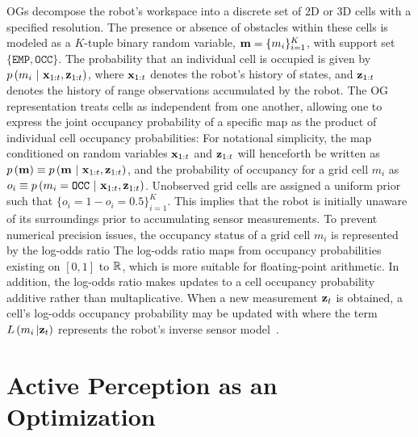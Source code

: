 OGs decompose the robot's workspace into a discrete set of 2D or 3D cells with a
specified resolution. The presence or absence of obstacles within these cells is modeled
as a $K$-tuple binary random variable, $\mathbf{m} = \{m_{i}\}_{i=1}^{K}$, with support set
$\{\texttt{EMP}, \texttt{OCC}\}$. The probability that an individual cell is occupied is
given by $p\left(m_{i} \ \vert \ \mathbf{x}_{1:t}, \mathbf{z}_{1:t}\right)$, where $\mathbf{x}_{1:t}$ denotes the
robot's history of states, and $\mathbf{z}_{1:t}$ denotes the history of range observations
accumulated by the robot. The OG representation treats cells as independent from one another,
allowing one to express the joint occupancy probability of a specific map as the product of individual
cell occupancy probabilities:
%
%
For notational simplicity, the map conditioned on random variables
$\mathbf{x}_{1:t}$ and $\mathbf{z}_{1:t}$ will henceforth be written as $p\left(\mathbf{m}\right)
\equiv p\left(\mathbf{m} \ \vert \ \mathbf{x}_{1:t}, \mathbf{z}_{1:t}\right)$, and the probability of occupancy
for a grid cell $m_i$ as $o_{i}\equiv p\left(m_{i}=\texttt{OCC}\ \vert \
\mbf{x}_{1:t}, \mbf{z}_{1:t}\right)$.
Unobserved grid cells are assigned a uniform prior such that
$\{o_{i} = 1 - o_{i} = 0.5\}_{i=1}^{K}$. This implies that the robot is
initially unaware of its surroundings prior to accumulating sensor measurements.
To prevent numerical precision issues, the
occupancy status of a grid cell $m_i$ is represented by the log-odds ratio
%
%
The log-odds ratio maps from occupancy probabilities existing on $[0, 1]$ to
${\mathbb{R}}$, which is more suitable for floating-point arithmetic. In addition,
the log-odds ratio makes updates to a cell occupancy probability additive rather
than multaplicative. When a new measurement $\mathbf{z}_t$ is obtained, a cell's
log-odds  occupancy probability
may be updated with
%
%
where the term $L\left(m_{i}\,  \vert \mathbf{z}_{t}\right)$ represents the robot's inverse sensor model~\cite{thrun2005probabilistic}.

\section{Active Perception as an Optimization}
\label{sec:active_perception}

